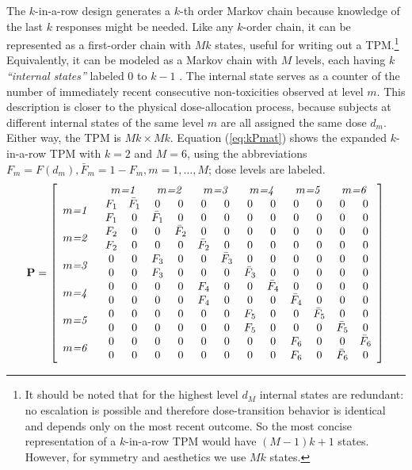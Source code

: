 The $k$-in-a-row design generates a $k$-th order Markov chain because knowledge of the last $k$ responses might be needed. Like any $k$-order chain, it can be represented as a first-order chain with $Mk$ states, useful for writing out a TPM.\footnote{It should be noted that for the highest level $d_M$ internal states are redundant: no escalation is possible and therefore dose-transition behavior is identical and depends only on the most recent outcome. So the most concise representation of a $k$-in-a-row TPM would have $(M-1)k+1$ states. However, for symmetry and aesthetics we use $Mk$ states.} Equivalently,  it can be modeled as a Markov chain with $M$ levels, each having $k$ \emph{``internal states''} labeled $0$ to $k-1$ \citep{Oron:Hoff:thek:2009,Weiss:Aspe:1994}. The internal state serves as a counter of the number of immediately recent consecutive non-toxicities observed at level $m$. This description is closer to the physical dose-allocation process, because subjects at different internal states of the same level $m$ are all assigned the same dose $d_m$. Either way, the TPM is $Mk\times Mk$. Equation (\ref{eq:kPmat}) shows the expanded $k$-in-a-row TPM with $k=2$ and $M=6$, using the abbreviations $F_m=F\left(d_m\right),\bar{F}_m=1-F_m, m=1,\ldots,M$; dose levels are labeled.
%
\begin{equation}\label{eq:kPmat}
\mathbf{P}=\left[\begin{array}{p{1cm}cccccccccccc}
& \multicolumn{2}{c}{\emph{$m$=1}} & \multicolumn{2}{c}{\emph{$m$=2}}& \multicolumn{2}{c}{\emph{$m$=3}}& \multicolumn{2}{c}{\emph{$m$=4}}& \multicolumn{2}{c}{\emph{$m$=5}}& \multicolumn{2}{c}{\emph{$m$=6}} \\
  \multirow{2}{*}{\emph{$m$=1}} &  F_1 &\bar{F}_1 &0 &0 &0 &0 &0 &0 &0 &0 &0 & 0\\
   &  F_1 &0         &\bar{F}_1 &0 &0 &0 &0 &0 &0 &0 &0& 0\\
  \multirow{2}{*}{\emph{$m$=2}} &  F_2 &0 &0 &\bar{F}_2 &0 &0 &0 &0 &0 &0 &0& 0\\
 &   F_2 &0 &0 &0 &\bar{F}_2  &0 &0 &0 &0 &0 &0& 0\\
  \multirow{2}{*}{\emph{$m$=3}} &  0    &0 &F_3 &0 &0   &\bar{F}_3 &0 &0 &0 &0 &0& 0\\
  &  0    &0 &F_3 &0 &0   &0 &\bar{F}_3 &0 &0 &0 &0& 0\\
  \multirow{2}{*}{\emph{$m$=4}} &  0    &0 &0   &0 &F_4 &0 & 0&\bar{F}_4 &0 &0 &0 &0\\
  &  0    &0 &0   &0 &F_4 &0 &0      & 0   &\bar{F}_4 &0 &0 &0\\
  \multirow{2}{*}{\emph{$m$=5}} &  0    &0 &0   &0 &0   &0 &F_5    & 0   &0 &\bar{F}_5 &0 &0\\
  &  0    &0 &0   &0 &0   &0 &F_5    & 0   &0 &0 &\bar{F}_5 &0\\
 \multirow{2}{*}{\emph{$m$=6}} &   0    &0 &0   &0 &0   &0 &0         &0 &F_6 &0 & 0&\bar{F}_6\\
  &  0    &0 &0   &0 &0   &0 &0         &0 &F_6 & 0 &\bar{F}_6 & 0\\
\end{array}\right]
\end{equation}
